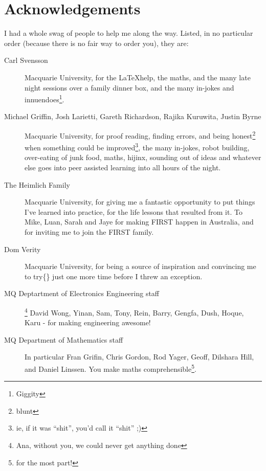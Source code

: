 \chapter{Acknowledgements}
\label{chap:Acknowledgements}
I had a whole swag of people to help me along the way. Listed, in no particular
order (because there is no fair way to order you), they are:
\begin{description}
  \item[Carl Svensson] Macquarie University, for the \LaTeX help, the maths, and
  the many late night sessions over a family dinner box, and the many in-jokes
  and innuendoes\footnote{Giggity}.
  
  \item[Michael Griffin, Josh Larietti, Gareth Richardson, Rajika Kuruwita,
  Justin Byrne] Macquarie University, for proof reading, finding errors, and
  being honest\footnote{blunt} when something could be improved\footnote{ie,
  if it was ``shit'', you'd call it ``shit'' ;)}, the many in-jokes, robot
  building, over-eating of junk food, maths, hijinx, sounding out of ideas and
  whatever else goes into peer assisted learning into all hours of the night.
  
  \item[The Heimlich Family] Macquarie University, for giving me a fantastic
  opportunity to put things I've learned into practice, for the life lessons
  that resulted from it. To Mike, Luan, Sarah and Jaye for making FIRST happen
  in Australia, and for inviting me to join the FIRST family.
  
  \item[Dom Verity] Macquarie University, for being a source of inspiration and
  convincing me to try\{\} just one more time before I threw an exception.
  
  \item[MQ Deptartment of Electronics Engineering staff]\footnote{Ana, without
  you, we could never get anything done} David Wong, Yinan, Sam, Tony, Rein,
  Barry, Gengfa, Dush, Hoque, Karu - for making engineering awesome!
  
  \item[MQ Department of Mathematics staff] In particular Fran Grifin, Chris
  Gordon, Rod Yager, Geoff, Dilshara Hill, and Daniel Linssen. You make maths
  comprehensible\footnote{for the most part!}.
  

\end{description}

